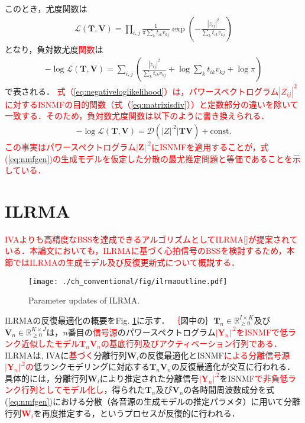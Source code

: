 このとき，尤度関数は
\begin{align}
    \mathcal{L}(\bm{T}, \bm{V}) = \prod_{i,j} \frac{1}{\pi \sum_k t_{ik} v_{kj} } \exp \left( -\frac{|z_{ij}|^2}{\sum_k t_{ik} v_{kj}} \right)
\end{align}
となり，負対数尤度\textcolor{red}{関数}は
\begin{align}
    -\log\mathcal{L}(\bm{T}, \bm{V}) = \sum_{i,j} \left( \frac{|z_{ij}|^2}{\sum_k t_{ik} v_{kj}} + \log \sum_k t_{ik} v_{kj} + \log \pi \right) \label{eq:negativeloglikelihood}
\end{align}
で表される．
\textcolor{red}{式（\ref{eq:negativeloglikelihood}）は，パワースペクトログラム$|Z_{ij}|^2$に対するISNMFの目的関数（式（\ref{eq:matrixisdiv}））と定数部分の違いを除いて一致する．そのため，負対数尤度関数は以下のように書き換えられる．}
\begin{align}
    -\log\mathcal{L}(\bm{T}, \bm{V}) = \mathcal{D} \left( |Z|^{.2} | \bm{TV} \right) + \mathrm{const.}
    \label{eq:isnmf}
\end{align}
\textcolor{red}{この事実はパワースペクトログラム$|\bm{Z}|^{.2}$にISNMFを適用することが，式(\ref{eq:nmfgen})の生成モデルを仮定した分散の最尤推定問題と等価であることを示している．}

\section{ILRMA}
\label{sec:conv:ilrma}

\textcolor{red}{IVAよりも高精度なBSSを達成できるアルゴリズムとしてILRMA[]が提案されている．本論文においても，ILRMAに基づく心拍信号のBSSを検討するため，本節ではILRMAの生成モデル及び反復更新式について概説する．}

\begin{figure}[!t]
\centering
\texttt{[image: ./ch\_conventional/fig/ilrmaoutline.pdf]}
\caption{Parameter updates of ILRMA.}
\label{fig:ilrma_outline}
\end{figure}

ILRMAの反復最適化の概要をFig. \ref{fig:ilrma_outline}に示す．
\textcolor{red}｛図中の｝$\bm{T}_n\in\mathbb{R}_{\geq 0}^{I\times K}$及び$\bm{V}_n\in\mathbb{R}_{\geq 0}^{K\times J}$は，$n$番目の\textcolor{red}{信号源}のパワースペクトログラム\textcolor{red}{$|\bm{Y}_n|^{.2}$をISNMFで低ランク近似したモデル$\bm{T}_n\bm{V}_n$の基底行列及びアクティベーション行列である．}
ILRMAは, IVAに\textcolor{red}{基づく}分離行列$\bm{W}_i$の反復最適化とISNMF\textcolor{red}{による分離信号源$|\bm{Y}_n|^{.2}$の}低ランクモデリングに対応する$\bm{T}_n\bm{V}_n$の反復最適化が交互に行われる．
具体的には，分離行列$\bm{W}_i$により推定された分離信号\textcolor{red}{$|\bm{Y}_n|^{.2}$}をISNMF\textcolor{red}{で非負低ランク行列としてモデル化し}，得られた$\bm{T}_n$及び$\bm{V}_n$の各時間周波数成分を式(\ref{eq:nmfgen})における分散（各音源の生成モデルの推定パラメタ）に用いて分離行列\textcolor{red}{$\bm{W}_i$}を再度推定する，というプロセスが反復的に行われる．

